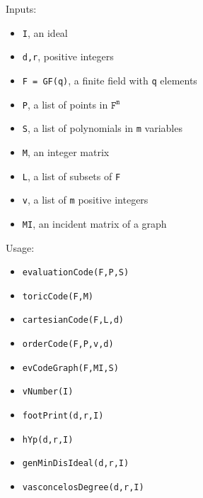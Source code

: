 \documentclass[12pt]{amsart}
\theoremstyle{plain}
\begin{document}
\medskip

Inputs:

\medskip

\begin{minipage}[t]{0.53\textwidth}
\begin{itemize}[leftmargin=0.55 cm]
  \item {\tt I}, an ideal
  \item {\tt d,r}, positive integers
  \item {\tt F = GF(q)}, a finite field with {\tt q} elements
  \item {\tt P}, a list of points in $\mathtt{F}^\mathtt{m}$
  \item {\tt S}, a list of polynomials in {\tt m} variables
\end{itemize}
\end{minipage}
\begin{minipage}[t]{0.45\textwidth}
\begin{itemize}[leftmargin=0.55 cm]
  \item {\tt M}, an integer matrix
  \item {\tt L}, a list of subsets of {\tt F}
  \item {\tt v}, a list of {\tt m} positive integers
  \item {\tt MI}, an incident matrix of a graph
 \end{itemize}
\end{minipage}


\medskip

Usage:

\medskip


\begin{minipage}[t]{0.53\textwidth}
\begin{itemize}[leftmargin=0.55 cm]
\item {\tt evaluationCode(F,P,S)}
\item {\tt toricCode(F,M)}
\item {\tt cartesianCode(F,L,d)}
\item {\tt orderCode(F,P,v,d)}
\item {\tt evCodeGraph(F,MI,S)}
\end{itemize}
\end{minipage}
\begin{minipage}[t]{0.45\textwidth}
\begin{itemize}[leftmargin=0.55 cm]
\item {\tt vNumber(I)}
\item {\tt footPrint(d,r,I)}
\item {\tt hYp(d,r,I)}
\item {\tt genMinDisIdeal(d,r,I)}
\item {\tt vasconcelosDegree(d,r,I)}
\end{itemize}
\end{minipage}
\end{document}
